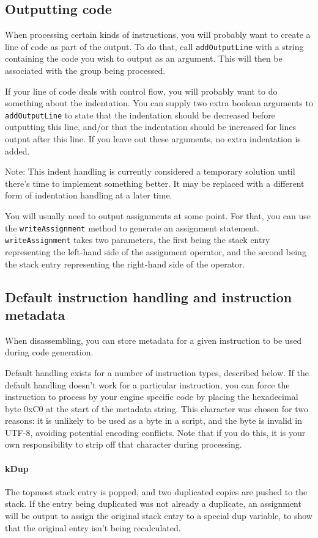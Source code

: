 \subsection{Outputting code}
When processing certain kinds of instructions, you will probably want to create a line of code as part of the output. To do that, call \verb+addOutputLine+ with a string containing the code you wish to output as an argument. This will then be associated with the group being processed.

If your line of code deals with control flow, you will probably want to do something about the indentation. You can supply two extra boolean arguments to \verb+addOutputLine+ to state that the indentation should be decreased before outputting this line, and/or that the indentation should be increased for lines output after this line. If you leave out these arguments, no extra indentation is added.

Note: This indent handling is currently considered a temporary solution until there's time to implement something better. It may be replaced with a different form of indentation handling at a later time.

You will usually need to output assignments at some point. For that, you can use the \verb+writeAssignment+ method to generate an assignment statement. \verb+writeAssignment+ takes two parameters, the first being the stack entry representing the left-hand side of the assignment operator, and the second being the stack entry representing the right-hand side of the operator.

\subsection{Default instruction handling and instruction metadata}
When disassembling, you can store metadata for a given instruction to be used during code generation.

Default handling exists for a number of instruction types, described below. If the default handling doesn't work for a particular instruction, you can force the instruction to process by your engine specific code by placing the hexadecimal byte 0xC0 at the start of the metadata string. This character was chosen for two reasons: it is unlikely to be used as a byte in a script, and the byte is invalid in UTF-8, avoiding potential encoding conflicts. Note that if you do this, it is your own responsibility to strip off that character during processing.

\paragraph{kDup}
The topmost stack entry is popped, and two duplicated copies are pushed to the stack. If the entry being duplicated was not already a duplicate, an assignment will be output to assign the original stack entry to a special dup variable, to show that the original entry isn't being recalculated.

